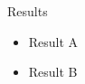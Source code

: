 \documentclass[overlay-policy=pages]{beamer-accessibility}
\begin{document}
\begin{frame}{Results}
\begin{itemize}
\item<1-> Result A
\item<2-> Result B
\end{itemize}
\end{frame}
\end{document}
